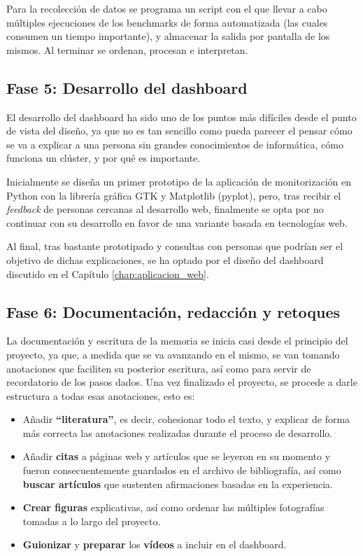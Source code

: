 Para la recolección de datos se programa un script con el que llevar a cabo múltiples ejecuciones de los benchmarks de forma automatizada (las cuales consumen un tiempo importante), y almacenar la salida por pantalla de los mismos. Al terminar se ordenan, procesan e interpretan.

\subsection{Fase 5: Desarrollo del dashboard}
El desarrollo del dashboard ha sido uno de los puntos más difíciles desde el punto de vista del diseño, ya que no es tan sencillo como pueda parecer el pensar cómo se va a explicar a una persona sin grandes conocimientos de informática, cómo funciona un clúster, y por qué es importante.

Inicialmente se diseña un primer prototipo de la aplicación de monitorización en Python con la librería gráfica GTK y Matplotlib (pyplot), pero, tras recibir el \textit{feedback} de personas cercanas al desarrollo web, finalmente se opta por no continuar con su desarrollo en favor de una variante basada en tecnologías web.

Al final, tras bastante prototipado y consultas con personas que podrían ser el objetivo de dichas explicaciones, se ha optado por el diseño del dashboard discutido en el Capítulo \ref{chap:aplicacion_web}.

\subsection{Fase 6: Documentación, redacción y retoques}
La documentación y escritura de la memoria se inicia casi desde el principio del proyecto, ya que, a medida que se va avanzando en el mismo, se van tomando anotaciones que faciliten su posterior escritura, así como para servir de recordatorio de los pasos dados. Una vez finalizado el proyecto, se procede a darle estructura a todas esas anotaciones, esto es:
\begin{itemize}
    \item Añadir \textbf{``literatura''}, es decir, cohesionar todo el texto, y explicar de forma más correcta las anotaciones realizadas durante el proceso de desarrollo.
    \item Añadir \textbf{citas} a páginas web y artículos que se leyeron en su momento y fueron consecuentemente guardados en el archivo de bibliografía, así como \textbf{buscar artículos} que sustenten afirmaciones basadas en la experiencia.
    \item \textbf{Crear figuras} explicativas, así como ordenar las múltiples fotografías tomadas a lo largo del proyecto.
    \item \textbf{Guionizar} y \textbf{preparar} los \textbf{vídeos} a incluir en el dashboard.
\end{itemize}

